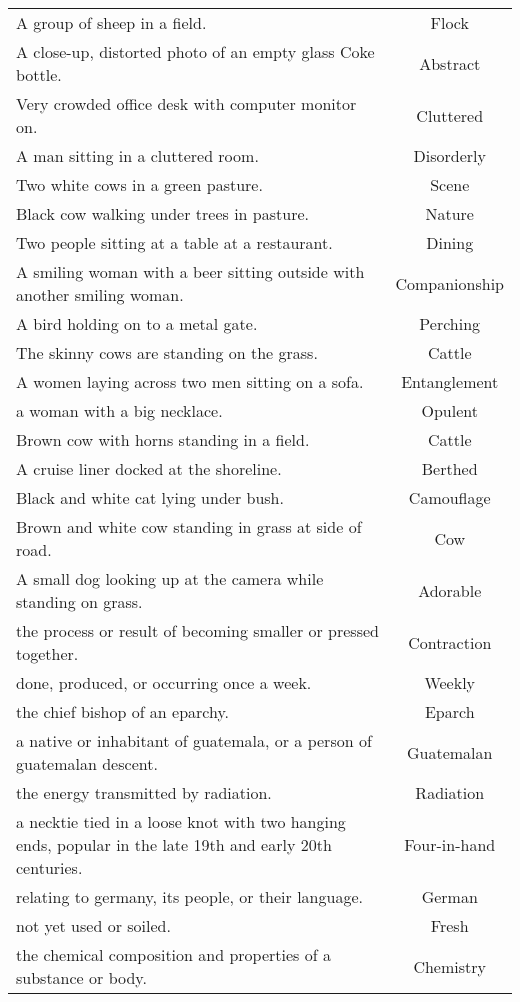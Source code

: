 \begin{longtable}{p{12cm}c}
A group of sheep in a field. & Flock\\
A close-up, distorted photo of an empty glass Coke bottle. & Abstract\\
Very crowded office desk with computer monitor on. & Cluttered\\
A man sitting in a cluttered room. & Disorderly\\
Two white cows in a green pasture. & Scene\\
Black cow walking under trees in pasture. & Nature\\
Two people sitting at a table at a restaurant. & Dining\\
A smiling woman with a beer sitting outside with another smiling woman. & Companionship\\
A bird holding on to a metal gate. & Perching\\
The skinny cows are standing on the grass. & Cattle\\
A women laying across two men sitting on a sofa. & Entanglement\\
a woman with a big necklace. & Opulent\\
Brown cow with horns standing in a field. & Cattle\\
A cruise liner docked at the shoreline. & Berthed\\
Black and white cat lying under bush. & Camouflage\\
Brown and white cow standing in grass at side of road. & Cow\\
A small dog looking up at the camera while standing on grass. & Adorable\\
the process or result of becoming smaller or pressed together. & Contraction\\
done, produced, or occurring once a week. & Weekly\\
the chief bishop of an eparchy. & Eparch\\
a native or inhabitant of guatemala, or a person of guatemalan descent. & Guatemalan\\
the energy transmitted by radiation. & Radiation\\
a necktie tied in a loose knot with two hanging ends, popular in the late 19th and early 20th centuries. & Four-in-hand\\
relating to germany, its people, or their language. & German\\
not yet used or soiled. & Fresh\\
the chemical composition and properties of a substance or body. & Chemistry\\

\end{longtable}
